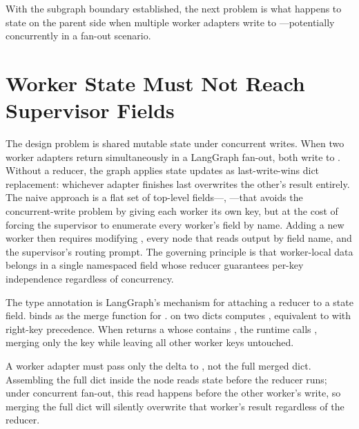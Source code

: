 With the subgraph boundary established, the next problem is what happens to
state on the parent side when multiple worker adapters write to
---potentially concurrently in a fan-out scenario.


\section{Worker State Must Not Reach Supervisor Fields}
\label{sec:sup-state}

The design problem is shared mutable state under concurrent writes. When
two worker adapters return simultaneously in a LangGraph fan-out, both
write to . Without a reducer, the graph applies
state updates as last-write-wins dict replacement: whichever adapter
finishes last overwrites the other's result entirely. The naive approach
is a flat set of top-level fields---,
---that avoids the concurrent-write problem by
giving each worker its own key, but at the cost of forcing the supervisor
to enumerate every worker's field by name. Adding a new worker then
requires modifying , every node that reads output by field
name, and the supervisor's routing prompt. The governing principle is that
worker-local data belongs in a single namespaced field whose reducer
guarantees per-key independence regardless of concurrency.

The  type annotation is LangGraph's mechanism for attaching
a reducer to a state field.  binds  as the merge function for
.  on two dicts computes
, equivalent to  with
right-key precedence. When  returns a 
whose  contains , the runtime calls , merging only the  key while leaving all
other worker keys untouched.

\begin{warningbox}
A worker adapter must pass only the delta 
to , not the full merged  dict.
Assembling the full dict inside the node reads state before the reducer
runs; under concurrent fan-out, this read happens before the other
worker's write, so merging the full dict will silently overwrite that
worker's result regardless of the reducer.
\end{warningbox}


